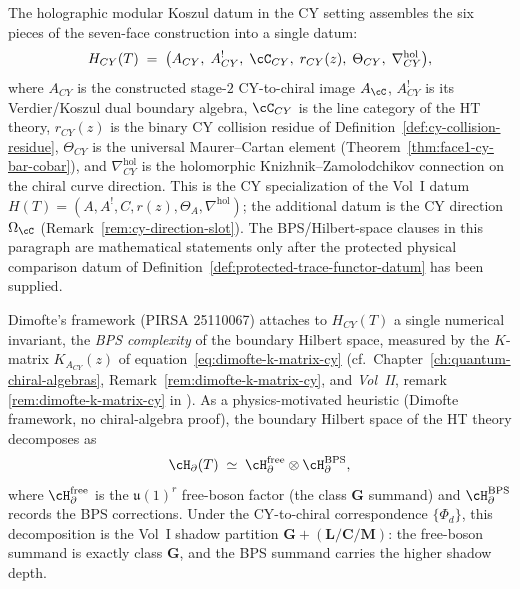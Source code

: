 \begin{remark}
\label{rem:bps-shadow-depth-cy}
The holographic modular Koszul datum in the CY setting assembles the six
pieces of the seven-face construction into a single datum:
\[
 H_{CY}(T) \;=\; \bigl(A_{CY},\; A_{CY}^{!},\; \cC_{CY},\; r_{CY}(z),\;
 \Theta_{CY},\; \nabla^{\mathrm{hol}}_{CY}\bigr),
\]
where $A_{CY}$ is the constructed stage-$2$ CY-to-chiral image $A_\cC$,
$A_{CY}^{!}$ is its Verdier/Koszul dual boundary algebra, $\cC_{CY}$ is the line
category of the HT theory, $r_{CY}(z)$ is the binary CY collision residue
of Definition~\ref{def:cy-collision-residue}, $\Theta_{CY}$ is the
universal Maurer--Cartan element (Theorem~\ref{thm:face1-cy-bar-cobar}),
and $\nabla^{\mathrm{hol}}_{CY}$ is the holomorphic Knizhnik--Zamolodchikov
connection on the chiral curve direction. This is the CY specialization
of the Vol~I datum $H(T) = (A, A^{!}, C, r(z), \Theta_A, \nabla^{\mathrm{hol}})$;
the additional datum is the CY direction $\Omega_\cC$
(Remark~\ref{rem:cy-direction-slot}).
The BPS/Hilbert-space clauses in this paragraph are mathematical
statements only after the protected physical comparison datum of
Definition~\ref{def:protected-trace-functor-datum} has been supplied.

Dimofte's framework (PIRSA 25110067) attaches to $H_{CY}(T)$ a single
numerical invariant, the \emph{BPS complexity} of the boundary Hilbert
space, measured by the $K$-matrix $K_{A_{CY}}(z)$ of
equation~\eqref{eq:dimofte-k-matrix-cy}
(cf.\ Chapter~\ref{ch:quantum-chiral-algebras},
Remark~\ref{rem:dimofte-k-matrix-cy}, and \emph{Vol~II}, remark
\ref{rem:dimofte-k-matrix-cy} in
\cite{VolII}). As a
physics-motivated heuristic (Dimofte framework, no chiral-algebra
proof), the boundary Hilbert space of the HT theory decomposes as
\[
 \cH_{\partial}(T) \;\simeq\; \cH_{\partial}^{\mathrm{free}} \otimes
 \cH_{\partial}^{\mathrm{BPS}},
\]
where $\cH_{\partial}^{\mathrm{free}}$ is the $\mathfrak{u}(1)^r$ free-boson
factor (the class $\mathbf{G}$ summand) and $\cH_{\partial}^{\mathrm{BPS}}$
records the BPS corrections. Under the CY-to-chiral correspondence $\{\Phi_d\}$, this
decomposition is the Vol~I shadow partition $\mathbf{G} +
(\mathbf{L}/\mathbf{C}/\mathbf{M})$: the free-boson summand is exactly
class $\mathbf{G}$, and the BPS summand carries the higher shadow depth.


\end{remark}
